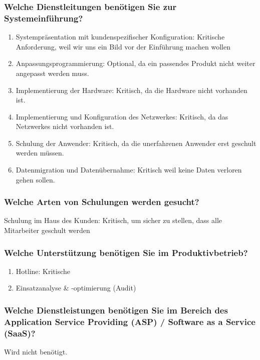 \subsubsection{Welche Dienstleitungen benötigen Sie zur Systemeinführung?}
\begin{enumerate}
	\item Systempräsentation mit kundenspezifischer Konfiguration: Kritische Anforderung, weil wir uns ein Bild vor der Einführung machen wollen
	\item Anpassungsprogrammierung: Optional, da ein passendes Produkt nicht weiter angepasst werden muss.
	\item Implementierung der Hardware: Kritisch, da die Hardware nicht vorhanden ist.
	\item Implementierung und Konfiguration des Netzwerkes: Kritisch, da das Netzwerkes nicht vorhanden ist.
	\item Schulung der Anwender: Kritisch, da die unerfahrenen Anwender erst geschult werden müssen.
	\item Datenmigration und Datenübernahme: Kritisch weil keine Daten verloren gehen sollen.
\end{enumerate}
\subsubsection{Welche Arten von Schulungen werden gesucht?}
Schulung im Haus des Kunden: Kritisch, um sicher zu stellen, dass alle Mitarbeiter geschult werden

\subsubsection{Welche Unterstützung benötigen Sie im Produktivbetrieb?}
\begin{enumerate}
	\item Hotline: Kritische
	\item Einsatzanalyse \& -optimierung (Audit)
\end{enumerate}

\subsubsection{Welche Dienstleistungen benötigen Sie im Bereich des Application Service Providing (ASP) / Software as a Service (SaaS)?}
Wird nicht benötigt.

